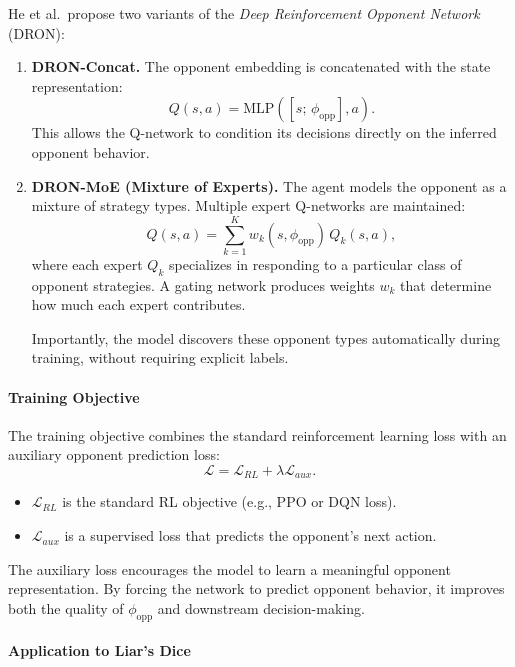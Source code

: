 \documentclass{article}
\begin{document}
He et al.\ propose two variants of the \emph{Deep Reinforcement Opponent Network} (DRON):

\begin{enumerate}
    \item \textbf{DRON-Concat.} The opponent embedding is concatenated with the state representation:
    \[
    Q(s,a) = \text{MLP}([s;\, \phi_{\text{opp}}], a).
    \]
    This allows the Q-network to condition its decisions directly on the inferred opponent behavior.

    \item \textbf{DRON-MoE (Mixture of Experts).} The agent models the opponent as a mixture of strategy types. Multiple expert Q-networks are maintained:
    \[
    Q(s,a) = \sum_{k=1}^{K} w_k(s, \phi_{\text{opp}})\, Q_k(s,a),
    \]
    where each expert $Q_k$ specializes in responding to a particular class of opponent strategies. A gating network produces weights $w_k$ that determine how much each expert contributes.

    Importantly, the model discovers these opponent types automatically during training, without requiring explicit labels.
\end{enumerate}

\paragraph{Training Objective}

The training objective combines the standard reinforcement learning loss with an auxiliary opponent prediction loss:
\[
\mathcal{L} = \mathcal{L}_{RL} + \lambda \mathcal{L}_{aux}.
\]

\begin{itemize}
    \item $\mathcal{L}_{RL}$ is the standard RL objective (e.g., PPO or DQN loss).
    \item $\mathcal{L}_{aux}$ is a supervised loss that predicts the opponent’s next action.
\end{itemize}

The auxiliary loss encourages the model to learn a meaningful opponent representation. By forcing the network to predict opponent behavior, it improves both the quality of $\phi_{\text{opp}}$ and downstream decision-making.

\paragraph{Application to Liar's Dice}
\end{document}
